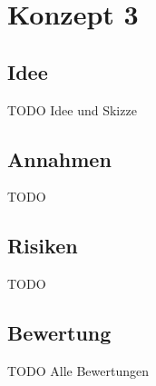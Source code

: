 \section{Konzept 3}

\subsection{Idee}
TODO Idee und Skizze

\subsection{Annahmen}
TODO

\subsection{Risiken}
TODO

\subsection{Bewertung}
TODO Alle Bewertungen